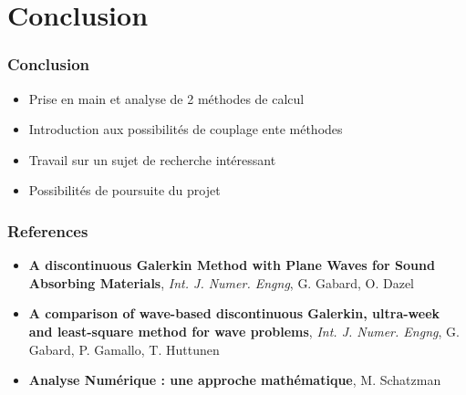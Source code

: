 \documentclass[10pt, compress]{beamer}
\begin{document}
\section*{Conclusion}

\begin{frame}
	\frametitle{Conclusion}
	\begin{itemize}
		\item Prise en main et analyse de 2 méthodes de calcul
		\item Introduction aux possibilités de couplage ente méthodes
		\item Travail sur un sujet de recherche intéressant
		\item Possibilités de poursuite du projet
	\end{itemize}
\end{frame}

\begin{frame}
    \frametitle{References}

    \begin{itemize}
        \item \textbf{A discontinuous Galerkin Method with Plane Waves for Sound Absorbing Materials}, \textit{Int. J.
            Numer. Engng}, G. Gabard, O.  Dazel
        \item \textbf{A comparison of wave-based discontinuous Galerkin, ultra-week and least-square method for wave
            problems}, \textit{Int. J.
            Numer. Engng}, G. Gabard, P. Gamallo, T. Huttunen
        \item \textbf{Analyse Numérique : une approche mathématique}, M. Schatzman
    \end{itemize}
\end{frame}

\end{document}
